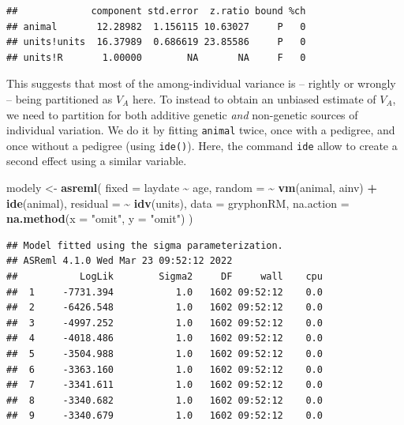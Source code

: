 \documentclass[
  12pt,
]{book}
\newenvironment{Shaded}{\begin{snugshade}}{\end{snugshade}}
\newcommand{\DataTypeTok}[1]{\textcolor[rgb]{0.13,0.29,0.53}{#1}}
\newcommand{\KeywordTok}[1]{\textcolor[rgb]{0.13,0.29,0.53}{\textbf{#1}}}
\newcommand{\NormalTok}[1]{#1}
\newcommand{\OperatorTok}[1]{\textcolor[rgb]{0.81,0.36,0.00}{\textbf{#1}}}
\newcommand{\StringTok}[1]{\textcolor[rgb]{0.31,0.60,0.02}{#1}}
\begin{document}
\begin{Shaded}
\end{Shaded}

\begin{verbatim}
##             component std.error  z.ratio bound %ch
## animal       12.28982  1.156115 10.63027     P   0
## units!units  16.37989  0.686619 23.85586     P   0
## units!R       1.00000        NA       NA     F   0
\end{verbatim}

This suggests that most of the among-individual variance is -- rightly or wrongly -- being partitioned as \(V_A\) here. To instead to obtain an unbiased estimate of \(V_A\), we need to partition for both additive genetic \emph{and} non-genetic sources of individual variation. We do it by fitting \texttt{animal} twice, once with a pedigree, and once without a pedigree (using \texttt{ide()}).
Here, the command \texttt{ide} allow to create a second effect using a similar variable.

\begin{Shaded}
\begin{Highlighting}[]
\NormalTok{modely \textless{}{-}}\StringTok{ }\KeywordTok{asreml}\NormalTok{(}
  \DataTypeTok{fixed =}\NormalTok{ laydate }\OperatorTok{\textasciitilde{}}\StringTok{ }\NormalTok{age,}
  \DataTypeTok{random =} \OperatorTok{\textasciitilde{}}\StringTok{ }\KeywordTok{vm}\NormalTok{(animal, ainv) }\OperatorTok{+}\StringTok{ }\KeywordTok{ide}\NormalTok{(animal),}
  \DataTypeTok{residual =} \OperatorTok{\textasciitilde{}}\StringTok{ }\KeywordTok{idv}\NormalTok{(units),}
  \DataTypeTok{data =}\NormalTok{ gryphonRM,}
  \DataTypeTok{na.action =} \KeywordTok{na.method}\NormalTok{(}\DataTypeTok{x =} \StringTok{"omit"}\NormalTok{, }\DataTypeTok{y =} \StringTok{"omit"}\NormalTok{)}
\NormalTok{)}
\end{Highlighting}
\end{Shaded}

\begin{verbatim}
## Model fitted using the sigma parameterization.
## ASReml 4.1.0 Wed Mar 23 09:52:12 2022
##           LogLik        Sigma2     DF     wall    cpu
##  1     -7731.394           1.0   1602 09:52:12    0.0
##  2     -6426.548           1.0   1602 09:52:12    0.0
##  3     -4997.252           1.0   1602 09:52:12    0.0
##  4     -4018.486           1.0   1602 09:52:12    0.0
##  5     -3504.988           1.0   1602 09:52:12    0.0
##  6     -3363.160           1.0   1602 09:52:12    0.0
##  7     -3341.611           1.0   1602 09:52:12    0.0
##  8     -3340.682           1.0   1602 09:52:12    0.0
##  9     -3340.679           1.0   1602 09:52:12    0.0
\end{verbatim}
\end{document}
